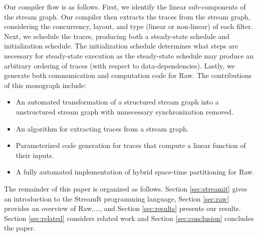 Our compiler flow is as follows. First, we identify the linear
sub-components of the stream graph.  Our compiler then extracts the
traces from the stream graph, considering the concurrency, layout, and
type (linear or non-linear) of each filter.  Next, we schedule the
traces, producing both a steady-state schedule and initialization
schedule.  The initialization schedule determines what steps are
necessary for steady-state execution as the steady-state schedule may
produce an arbitrary ordering of traces (with respect to
data-dependencies).  Lastly, we generate both communication and
computation code for Raw.  The contributions of this monograph include:
\begin{itemize}
\item An automated transformation of a structured stream graph into a
unstructured stream graph with unnecessary synchronization removed.
\item An algorithm for extracting traces from a stream graph.
\item Parameterized code generation for traces that compute a
linear function of their inputs.
\item A fully automated implementation of hybrid space-time
partitioning for Raw.
\end{itemize}

The remainder of this paper is organized as follows.  Section 
\ref{sec:streamit} gives an introduction to the StreamIt programming
language, Section \ref{sec:raw} provides an overview of Raw,...,
and Section \ref{sec:results} presents our results.  Section 
\ref{sec:related} considers related work and Section 
\ref{sec:conclusion} concludes the paper.


